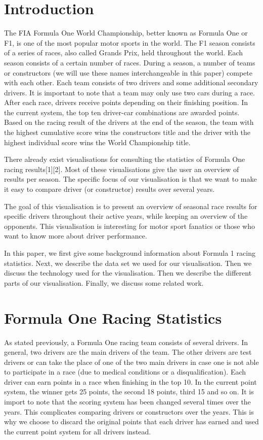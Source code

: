 \documentclass{sigchi}
\begin{document}
\section{Introduction}
The FIA Formula One World Championship, better known as Formula One or F1, is one of the most popular motor sports in the world. The F1 season consists of a series of races, also called Grands Prix, held throughout the world. Each season consists of a certain number of races. During a season, a number of teams or constructors (we will use these names interchangeable in this paper) compete with each other. Each team consists of two drivers and some additional secondary drivers. It is important to note that a team may only use two cars during a race. After each race, drivers receive points depending on their finishing position. In the current system, the top ten driver-car combinations are awarded points. Based on the racing result of the drivers at the end of the season, the team with the highest cumulative score wins the constructors title and the driver with the highest individual score wins the World Championship title.
 
There already exist visualisations for consulting the statistics of Formula One racing results[1][2]. Most of these visualisations give the user an overview of results per season. The specific focus of our visualisation is that we want to make it easy to compare driver (or constructor) results over several years.
 
The goal of this visualisation is to present an overview of seasonal race results for specific drivers throughout their active years, while keeping an overview of the opponents. This visualisation is interesting for motor sport fanatics or those who want to know more about driver performance.
 
In this paper, we first give some background information about Formula 1 racing statistics. Next, we describe the data set we used for our visualisation. Then we discuss the technology used for the visualisation. Then we describe the different parts of our visualisation. Finally, we discuss some related work. 



\section{Formula One Racing Statistics}

As stated previously, a Formula One racing team consists of several drivers. In general, two drivers are the main drivers of the team. The other drivers are test drivers or can take the place of one of the two main drivers in case one is not able to participate in a race (due to medical conditions or a disqualification). Each driver can earn points in a race when finishing in the top 10. In the current point system, the winner gets 25 points, the second 18 points, third 15 and so on. It is import to note that the scoring system has been changed several times over the years. This complicates comparing drivers or constructors over the years. This is why we choose to discard the original points that each driver has earned and used the current point system for all drivers instead.
\end{document}
